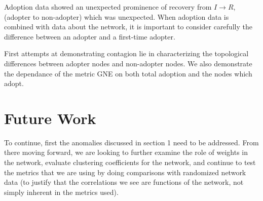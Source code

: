 \documentclass[12pt]{article}
\begin{document}
Adoption data showed an unexpected prominence of recovery from \(I \rightarrow R\), (adopter to non-adopter) which was unexpected. When adoption data is combined with data about the network, it is important to consider carefully the difference between an adopter and a first-time adopter.

First attempts at demonstrating contagion lie in characterizing the topological differences between adopter nodes and non-adopter nodes. We also demonstrate the dependance of the metric GNE on both total adoption and the nodes which adopt.

\section{Future Work}
To continue, first the anomalies discussed in section 1 need to be addressed. From there moving forward, we are looking to further examine the role of weights in the network, evaluate clustering coefficients for the network, and continue to test the metrics that we are using by doing comparisons with randomized network data (to justify that the correlations we see are functions of the network, not simply inherent in the metrics used).



\end{document}
